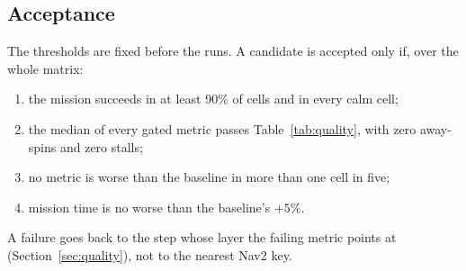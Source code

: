\subsection{Acceptance}
\label{sec:accept}
The thresholds are fixed before the runs. A candidate is accepted only if, over the whole matrix:
\begin{enumerate}[leftmargin=*, itemsep=1pt]
\item the mission succeeds in at least 90\% of cells and in every calm cell;
\item the median of every gated metric passes Table~\ref{tab:quality}, with zero away-spins and zero stalls;
\item no metric is worse than the baseline in more than one cell in five;
\item mission time is no worse than the baseline's $+5\%$.
\end{enumerate}
A failure goes back to the step whose layer the failing metric points at
(Section~\ref{sec:quality}), not to the nearest Nav2 key.

